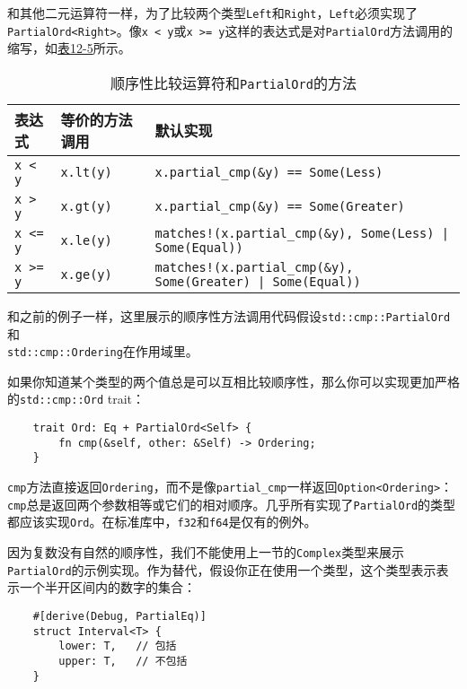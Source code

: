 和其他二元运算符一样，为了比较两个类型\texttt{Left}和\texttt{Right}，\texttt{Left}必须实现了\\
\texttt{PartialOrd<Right>}。像\texttt{x < y}或\texttt{x >= y}这样的表达式是对\texttt{PartialOrd}方法调用的缩写，如\hyperref[t12-5]{表12-5}所示。

\begin{table}[htbp]
    \centering
    \caption{顺序性比较运算符和\texttt{PartialOrd}的方法}
    \label{t12-5}
    \begin{tabular}{lll}
        \hline
        \textbf{表达式} & \textbf{等价的方法调用}   & \textbf{默认实现} \\
        \hline

        \texttt{x < y}  & \texttt{x.lt(y)}  & \texttt{x.partial\_cmp(\&y) == Some(Less)}    \\
        \rowcolor{tablecolor}
        \texttt{x > y}  & \texttt{x.gt(y)}  & \texttt{x.partial\_cmp(\&y) == Some(Greater)} \\
        \texttt{x <= y} & \texttt{x.le(y)}  & \texttt{matches!(x.partial\_cmp(\&y), Some(Less) | Some(Equal))}  \\
        \rowcolor{tablecolor}
        \texttt{x >= y} & \texttt{x.ge(y)}  & \texttt{matches!(x.partial\_cmp(\&y), Some(Greater) | Some(Equal))}   \\
    \end{tabular}
\end{table}

和之前的例子一样，这里展示的顺序性方法调用代码假设\texttt{std::cmp::PartialOrd}和\\
\texttt{std::cmp::Ordering}在作用域里。

如果你知道某个类型的两个值总是可以互相比较顺序性，那么你可以实现更加严格的\texttt{std::cmp::Ord} trait：
\begin{verbatim}
    trait Ord: Eq + PartialOrd<Self> {
        fn cmp(&self, other: &Self) -> Ordering;
    }
\end{verbatim}

\texttt{cmp}方法直接返回\texttt{Ordering}，而不是像\texttt{partial\_cmp}一样返回\texttt{Option<Ordering>}：\texttt{cmp}总是返回两个参数相等或它们的相对顺序。几乎所有实现了\texttt{PartialOrd}的类型都应该实现\texttt{Ord}。在标准库中，\texttt{f32}和\texttt{f64}是仅有的例外。

因为复数没有自然的顺序性，我们不能使用上一节的\texttt{Complex}类型来展示\texttt{PartialOrd}的示例实现。作为替代，假设你正在使用一个类型，这个类型表示表示一个半开区间内的数字的集合：
\begin{verbatim}
    #[derive(Debug, PartialEq)]
    struct Interval<T> {
        lower: T,   // 包括
        upper: T,   // 不包括
    }
\end{verbatim}

